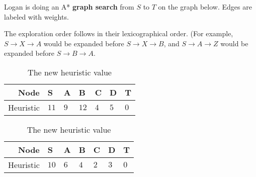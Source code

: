 
Logan is doing an A* \textbf{graph search} from $S$ to $T$ on the graph below. Edges are labeled with weights.

The exploration order follows in their lexicographical order. (For example, $S \to X \to A$ would be expanded before $S \to X \to B$, and $S \to A \to Z$ would be expanded before $S \to B \to A$.
\begin{table}[!ht]
\begin{minipage}[b]{0.6\linewidth}
\centering
\end{minipage}
    \begin{minipage}[b]{0.35\linewidth}
    \centering
    \begin{tabular}{|r|l|l|l|l|l|l|}
    \hline
        Node & S & A & B & C & D& T \\ \hline
        Heuristic & $11$ & $9$ & $12$ & $4$ & $5$ & $0$ \\ \hline
    \end{tabular}
    \caption{The initial heuristic value}
    \label{tab:heuristic}
    \begin{table}[H]
    \centering
    \begin{tabular}{|r|l|l|l|l|l|l|}
    \hline
        Node & S & A & B & C & D& T \\ \hline
        Heuristic & $10$ & $6$ & $4$ & $2$ & $3$ & $0$ \\ \hline
    \end{tabular}
    \caption{The new heuristic value}
    \label{tab:new}
    \end{table}
\end{minipage}
\end{table}\\


